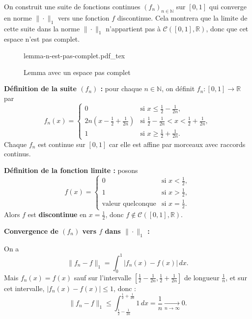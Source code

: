 \documentclass[a4paper]{report}
\theoremstyle{definition}
\newcommand{\incfig}[1]{%
    \def\svgwidth{\columnwidth}
    {#1.pdf_tex}
}
\begin{document}
\begin{preuve}
    On construit une suite de fonctions continues $(f_n)_{n \in \mathbb{N}}$ sur $[0,1]$ qui converge en norme $\| \cdot \|_1$ vers une fonction $f$ discontinue. Cela montrera que la limite de cette suite dans la norme $\| \cdot \|_1$ n’appartient pas à $\mathcal{C}([0,1], \mathbb{R})$, donc que cet espace n’est pas complet.
    
\begin{figure}[H]
    \centering
    \incfig{lemma-n-est-pas-complet}
    \caption{Lemma avec un espace pas complet}
    \label{fig:lemma-n-est-pas-complet}
\end{figure}

\medskip

\textbf{Définition de la suite $(f_n)$ :} pour chaque $n \in \mathbb{N}$, on définit $f_n : [0,1] \to \mathbb{R}$ par
\[
f_n(x) = 
\begin{cases}
0 & \text{si } x \le \frac{1}{2} - \frac{1}{2n}, \\[4pt]
2n\left(x - \frac{1}{2} + \frac{1}{2n}\right) & \text{si } \frac{1}{2} - \frac{1}{2n} < x < \frac{1}{2} + \frac{1}{2n}, \\[4pt]
1 & \text{si } x \ge \frac{1}{2} + \frac{1}{2n}.
\end{cases}
\]
Chaque $f_n$ est continue sur $[0,1]$ car elle est affine par morceaux avec raccords continus.

\medskip

\textbf{Définition de la fonction limite :} posons
\[
f(x) = 
\begin{cases}
0 & \text{si } x < \frac{1}{2}, \\
1 & \text{si } x > \frac{1}{2}, \\
\text{valeur quelconque} & \text{si } x = \frac{1}{2}.
\end{cases}
\]
Alors $f$ est \textbf{discontinue} en $x = \frac{1}{2}$, donc $f \notin \mathcal{C}([0,1], \mathbb{R})$.

\medskip

\textbf{Convergence de $(f_n)$ vers $f$ dans $\| \cdot \|_1$ :}

On a
\[
\|f_n - f\|_1 = \int_0^1 |f_n(x) - f(x)|\, dx.
\]
Mais $f_n(x) = f(x)$ sauf sur l’intervalle $\left[\frac{1}{2} - \frac{1}{2n}, \frac{1}{2} + \frac{1}{2n}\right]$ de longueur $\frac{1}{n}$, et sur cet intervalle, $|f_n(x) - f(x)| \le 1$, donc :
\[
\|f_n - f\|_1 \le \int_{\frac{1}{2} - \frac{1}{2n}}^{\frac{1}{2} + \frac{1}{2n}} 1\, dx = \frac{1}{n} \xrightarrow[n \to \infty]{} 0.
\]


\end{preuve}
\end{document}

